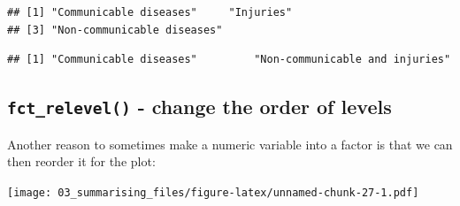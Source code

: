 \documentclass[12pt,]{krantz}
\makeatletter
\newenvironment{Shaded}{\begin{snugshade}}{\end{snugshade}}
\newcommand{\CommentTok}[1]{\textcolor[rgb]{0.56,0.35,0.01}{\textit{#1}}}
\newcommand{\DataTypeTok}[1]{\textcolor[rgb]{0.13,0.29,0.53}{#1}}
\newcommand{\KeywordTok}[1]{\textcolor[rgb]{0.13,0.29,0.53}{\textbf{#1}}}
\newcommand{\NormalTok}[1]{#1}
\newcommand{\OperatorTok}[1]{\textcolor[rgb]{0.81,0.36,0.00}{\textbf{#1}}}
\newcommand{\StringTok}[1]{\textcolor[rgb]{0.31,0.60,0.02}{#1}}
\newenvironment{kframe}{%
\medskip{}
\setlength{\fboxsep}{.8em}
 \def\at@end@of@kframe{}%
 \ifinner\ifhmode%
  \def\at@end@of@kframe{\end{minipage}}%
  \begin{minipage}{\columnwidth}%
 \fi\fi%
 \def\FrameCommand##1{\hskip\@totalleftmargin \hskip-\fboxsep
 \colorbox{shadecolor}{##1}\hskip-\fboxsep
     \hskip-\linewidth \hskip-\@totalleftmargin \hskip\columnwidth}%
 \MakeFramed {\advance\hsize-\width
   \@totalleftmargin\z@ \linewidth\hsize
   \@setminipage}}%
 {\par\unskip\endMakeFramed%
 \at@end@of@kframe}
\renewenvironment{Shaded}{\begin{kframe}}{\end{kframe}}
\theoremstyle{definition}
\theoremstyle{definition}
\theoremstyle{definition}
\theoremstyle{remark}
\makeatother
\begin{document}
\begin{verbatim}
## [1] "Communicable diseases"     "Injuries"                 
## [3] "Non-communicable diseases"
\end{verbatim}

\begin{Shaded}
\end{Shaded}

\begin{verbatim}
## [1] "Communicable diseases"         "Non-communicable and injuries"
\end{verbatim}

\hypertarget{fct_relevel---change-the-order-of-levels}{%
\subsection{\texorpdfstring{\texttt{fct\_relevel()} - change the order
of
levels}{fct\_relevel() - change the order of levels}}\label{fct_relevel---change-the-order-of-levels}}

Another reason to sometimes make a numeric variable into a factor is
that we can then reorder it for the plot:

\begin{Shaded}
\end{Shaded}

\texttt{[image: 03\_summarising\_files/figure-latex/unnamed-chunk-27-1.pdf]}
\end{document}
